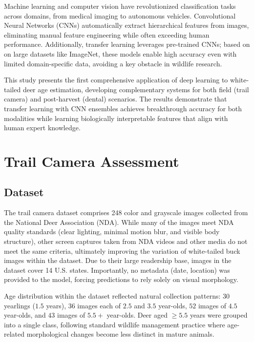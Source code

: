 \documentclass{iopjournal}
\begin{document}
Machine learning and computer vision have revolutionized classification tasks across domains, from medical imaging to autonomous vehicles. Convolutional Neural Networks (CNNs) automatically extract hierarchical features from images, eliminating manual feature engineering while often exceeding human performance. Additionally, transfer learning leverages pre-trained CNNs; based on on large datasets like ImageNet, these models enable high accuracy even with limited domain-specific data, avoiding a key obstacle in wildlife research.

This study presents the first comprehensive application of deep learning to white-tailed deer age estimation, developing complementary systems for both field (trail camera) and post-harvest (dental) scenarios. The results demonstrate that transfer learning with CNN ensembles achieves breakthrough accuracy for both modalities while learning biologically interpretable features that align with human expert knowledge.

\section{Trail Camera Assessment}

\subsection{Dataset}

The trail camera dataset comprises 248 color and grayscale images collected from the National Deer Association (NDA). While many of the images meet NDA quality standards (clear lighting, minimal motion blur, and visible body structure), other screen captures taken from NDA videos and other media do not meet the same criteria, ultimately improving the variation of white-tailed buck images within the dataset. Due to their large readership base, images in the dataset cover 14 U.S. states. Importantly, no metadata (date, location) was provided to the model, forcing predictions to rely solely on visual morphology.

Age distribution within the dataset reflected natural collection patterns: $30$ yearlings ($1.5$ years), $36$ images each of $2.5$ and $3.5$ year-olds, $52$ images of $4.5$ year-olds, and $43$ images of $5.5+$ year-olds. Deer aged $\geq5.5$ years were grouped into a single class, following standard wildlife management practice where age-related morphological changes become less distinct in mature animals.
\end{document}
